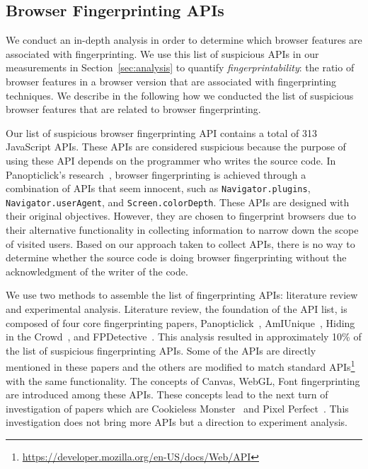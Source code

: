 \subsection{Browser Fingerprinting APIs}
\label{sec:fp-apis}

We conduct an in-depth analysis in order to determine which browser features are associated with fingerprinting. We use this list of suspicious APIs in our measurements in Section~\ref{sec:analysis} to quantify \textit{fingerprintability}: the ratio of browser features in a browser version that are associated with fingerprinting techniques. We describe in the following how we conducted the list of suspicious browser features that are related to browser fingerprinting.

Our list of suspicious browser fingerprinting API contains a total of 313 JavaScript APIs. These APIs are considered suspicious because the purpose of using these API depends on the programmer who writes the source code. In Panopticlick's research~\cite{panopticlick}, browser fingerprinting is achieved through a combination of APIs that seem innocent, such as \texttt{Navigator.plugins}, \texttt{Navigator.userAgent}, and \texttt{Screen.colorDepth}. These APIs are designed with their original objectives. However, they are chosen to fingerprint browsers due to their alternative functionality in collecting information to narrow down the scope of visited users. Based on our approach taken to collect APIs, there is no way to determine whether the source code is doing browser fingerprinting without the acknowledgment of the writer of the code. 

We use two methods to assemble the list of fingerprinting APIs: literature review and experimental analysis. Literature review, the foundation of the API list, is composed of four core fingerprinting papers, Panopticlick~\cite{panopticlick}, AmIUnique~\cite{amiunique}, Hiding in the Crowd~\cite{hidinginthecrowd}, and FPDetective~\cite{fpdetective}. This analysis resulted in approximately 10\% of the list of suspicious fingerprinting APIs. Some of the APIs are directly mentioned in these papers and the others are modified to match standard APIs\footnote{\url{https://developer.mozilla.org/en-US/docs/Web/API}} with the same functionality. The concepts of Canvas, WebGL, Font fingerprinting are introduced among these APIs. These concepts lead to the next turn of investigation of papers which are Cookieless Monster~\cite{cookiemonster-SP13} and Pixel Perfect~\cite{mowery2012pixel}. This investigation does not bring more APIs but a direction to experiment analysis. 

